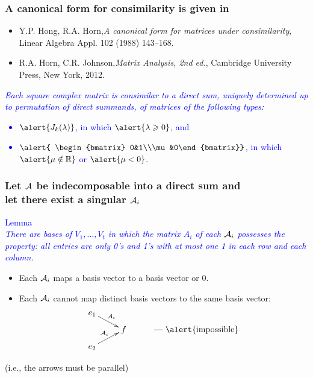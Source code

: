 \documentclass[usenames,dvipsnames]{beamer}
\renewcommand{\ge}{\geqslant}
\begin{document}
\begin{frame}

\frametitle{A canonical form  for consimilarity
is given in}


\begin{itemize}
  \item \alert{Y.P. Hong, R.A.
      Horn},{\it A canonical form
      for matrices under
      consimilarity}, Linear
      Algebra Appl. 102 (1988)
      143--168.
  \item \alert{R.A. Horn, C.R.
      Johnson},{\it Matrix
      Analysis, 2nd ed.}, Cambridge
      University Press, New York,
      2012.
\end{itemize}

\vspace{0.8cm}

 \textcolor{blue}{\it Each square
complex matrix is consimilar to a
direct sum, uniquely determined up to
permutation of direct summands, of
matrices of the following types:
\begin{itemize}
  \item $\alert{J_k(\lambda)}$, in
      which $\alert{\lambda\ge 0}$,
      and
  \item $\alert{
\begin{bmatrix} 0&1\\\mu
&0\end{bmatrix}}$,  in which
      $\alert{\mu\notin\mathbb R}$
      or $\alert{\mu<0}$.
\end{itemize}}

\end{frame}

\begin{frame}

\frametitle{Let $\cal
A$ be indecomposable into a direct
sum and\\ let there exist a singular ${\cal
A}_i$}


\textcolor{blue}{Lemma \\{\it There
are bases of $V_1,\dots,V_t$ in which
the matrix $A_i$ of each ${\cal A}_i$
possesses the property: all entries are
only 0's and 1's with at most one 1 in
each row and each column.}} \bigskip

\begin{corollary}
\begin{itemize}

  \item Each ${\cal A}_i$ maps a
      basis vector to a basis
      vector or $0$.
\item Each ${\cal A}_i$
    \alert{cannot map distinct}
    basis vectors to \alert{the
    same} basis vector:
$$
\xymatrix@R=6pt{
e_1\ar[rd]^{{\cal A}_i}&&\\
&f&\ \text{--- \alert{impossible}}\\
e_2\ar[ru]^{{\cal A}_i}&&\\}
$$
\end{itemize}
\end{corollary}
(i.e., the arrows must be parallel)
\end{frame}
\end{document}
